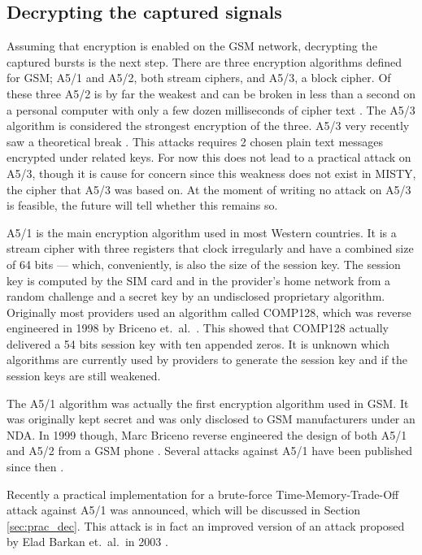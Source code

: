 \documentclass[a4paper,11pt]{llncs}
\begin{document}
\subsection{Decrypting the captured signals}\label{sec:th_dec}
Assuming that encryption is enabled on the GSM network, decrypting the captured bursts is the next step. There are three encryption algorithms defined for GSM; A5/1 and A5/2, both stream ciphers, and A5/3, a block cipher. Of these three A5/2 is by far the weakest and can be broken in less than a second on a personal computer with only a few dozen milliseconds of cipher text \cite{barkan:a512}. The A5/3 algorithm is considered the strongest encryption of the three. A5/3 very recently saw a theoretical break \cite{dunkA53}. This attacks requires 2 chosen plain text messages encrypted under related keys. For now this does not lead to a practical attack on A5/3, though it is cause for concern since this weakness does not exist in MISTY, the cipher that A5/3 was based on. At the moment of writing no attack on A5/3 is feasible, the future will tell whether this remains so.

A5/1 is the main encryption algorithm used in most Western countries. It is a stream cipher with three registers that clock irregularly and have a combined size of 64 bits --- which, conveniently, is also the size of the session key. The session key is computed by the SIM card and in the provider's home network from a random challenge and a secret key by an undisclosed proprietary algorithm. Originally most providers used an algorithm called COMP128, which was reverse engineered in 1998 by Briceno et.\ al.\ \cite{Briceno:a51}. This showed that COMP128 actually delivered a 54 bits session key with ten appended zeros. It is unknown which algorithms are currently used by providers to generate the session key and if the session keys are still weakened.

The A5/1 algorithm was actually the first encryption algorithm used in GSM. It was originally kept secret and was only disclosed to GSM manufacturers under an NDA. In 1999 though, Marc Briceno reverse engineered the design of both A5/1 and A5/2 from a GSM phone \cite{Briceno:a51}. Several attacks against A5/1 have been published since then \cite{golicA51,barkan:a512,barkanA51}.

Recently a practical implementation for a brute-force Time-Memory-Trade-Off attack against A5/1 was announced, which will be discussed in Section \ref{sec:prac_dec}. This attack is in fact an improved version of an attack proposed by Elad Barkan et.\ al.\ in 2003 \cite{barkan:a512}.
\end{document}
